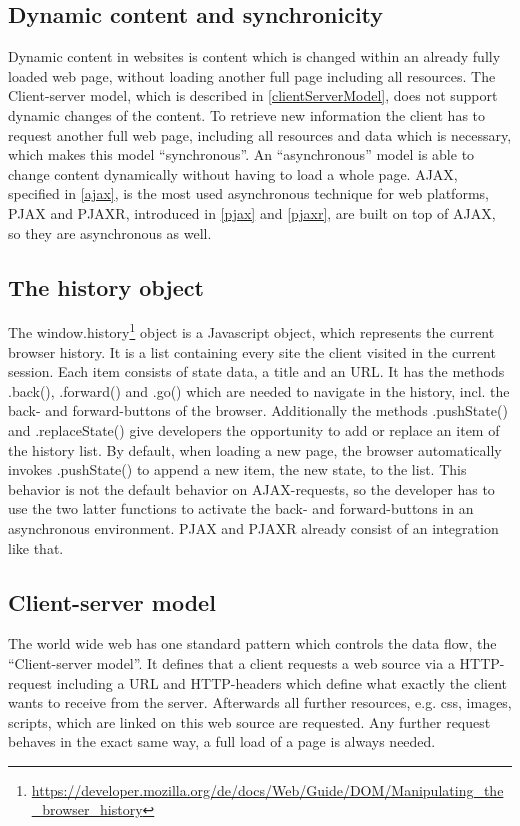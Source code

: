 \documentclass[f,bachelor,binding,twoside,palatino]{WeSTthesis}
\def \ajax {AJAX}
\def \pjax {PJAX}
\def \pjaxr {PJAXR}
\def \httpRequest {HTTP-request}
\begin{document}
    \subsection{Dynamic content and synchronicity}
      Dynamic content in websites is content which is changed within an already fully loaded web page, without loading another full page including all resources. The Client-server model, which is described in \ref{clientServerModel}, does not support dynamic changes of the content. To retrieve new information the client has to request another full web page, including all resources and data which is necessary, which makes this model \enquote{synchronous}.
      An \enquote{asynchronous} model is able to change content dynamically without having to load a whole page. \ajax{}, specified in \ref{ajax}, is the most used asynchronous technique for web platforms, \pjax{} and \pjaxr{}, introduced in \ref{pjax} and \ref{pjaxr}, are built on top of \ajax{}, so they are asynchronous as well.
      

      \subsection{The history object\label{theHistoryObject}}
      The window.history\footnote{\url{https://developer.mozilla.org/de/docs/Web/Guide/DOM/Manipulating_the_browser_history}} object is a Javascript object, which represents the current browser history. It is a list containing every site the client visited in the current session. Each item consists of state data, a title and an URL. It has the methods .back(), .forward() and .go() which are needed to navigate in the history, incl.  the back- and forward-buttons of the browser. Additionally the methods .pushState() and .replaceState() give developers the opportunity to add or replace an item of the history list. By default, when loading a new page, the browser automatically invokes .pushState() to append a new item, the new state, to the list. This behavior is not the default behavior on \ajax-requests, so the developer has to use the two latter functions to activate the back- and forward-buttons in an asynchronous environment. \pjax{} and \pjaxr{} already consist of an integration like that.


  \subsection{Client-server model\label{clientServerModel}}
    The world wide web has one standard pattern which controls the data flow, the \enquote{Client-server model}. It defines that a client requests a web source via a \httpRequest{} including a URL and HTTP-headers which define what exactly the client wants to receive from the server. Afterwards all further resources, e.g. css, images, scripts, which are linked on this web source are requested. Any further request behaves in the exact same way, a full load of a page is always needed.
\end{document}
